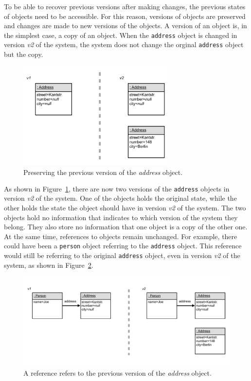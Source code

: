 To be able to recover previous versions after making changes, the previous states of objects need to be accessible.
For this reason, versions of objects are preserved and changes are made to new versions of the objects.
A version of an object is, in the simplest case, a copy of an object.
When the \lstinline{address} object is changed in version \emph{v2} of the system, the system does not change the orginal \lstinline{address} object but the copy.

\begin{figure}[h!]
    \centering
    \includegraphics[width=0.7\textwidth]{figures/4_approach/3_previousVersionPreserved.pdf}
    \caption{Preserving the previous version of the \emph{address} object.}
    \label{fig:VersionPreserved}
\end{figure}

As shown in Figure~\ref{fig:VersionPreserved}, there are now two versions of the \lstinline{address} objects in version \emph{v2} of the system.
One of the objects holds the original state, while the other holds the state the object should have in version \emph{v2} of the system.
The two objects hold no information that indicates to which version of the system they belong.
They also store no information that one object is a copy of the other one.
At the same time, references to objects remain unchanged.
For example, there could have been a \lstinline{person} object referring to the \lstinline{address} object.
This reference would still be referring to the original \lstinline{address} object, even in version \emph{v2} of the system, as shown in Figure~\ref{fig:ReferenceFixedToPreviousVersion}.

\begin{figure}[h!]
    \centering
    \includegraphics[width=\textwidth]{figures/4_approach/4_referenceToPreviousVersion.pdf}
    \caption{A reference refers to the previous version of the \emph{address} object.}
    \label{fig:ReferenceFixedToPreviousVersion}
\end{figure}

